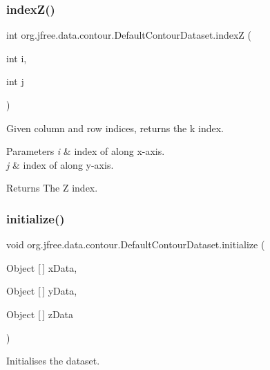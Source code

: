 \subsubsection{\texorpdfstring{index\+Z()}{indexZ()}}
{\footnotesize\ttfamily int org.\+jfree.\+data.\+contour.\+Default\+Contour\+Dataset.\+indexZ (\begin{DoxyParamCaption}\item[{int}]{i,  }\item[{int}]{j }\end{DoxyParamCaption})}

Given column and row indices, returns the k index.


\begin{DoxyParams}{Parameters}
{\em i} & index of along x-\/axis. \\
\hline
{\em j} & index of along y-\/axis.\\
\hline
\end{DoxyParams}
\begin{DoxyReturn}{Returns}
The Z index. 
\end{DoxyReturn}
\mbox{\label{classorg_1_1jfree_1_1data_1_1contour_1_1_default_contour_dataset_aeb6067364291f3fdf4dd53b27da75304}} 
\subsubsection{\texorpdfstring{initialize()}{initialize()}}
{\footnotesize\ttfamily void org.\+jfree.\+data.\+contour.\+Default\+Contour\+Dataset.\+initialize (\begin{DoxyParamCaption}\item[{Object \mbox{[}$\,$\mbox{]}}]{x\+Data,  }\item[{Object \mbox{[}$\,$\mbox{]}}]{y\+Data,  }\item[{Object \mbox{[}$\,$\mbox{]}}]{z\+Data }\end{DoxyParamCaption})}

Initialises the dataset.


